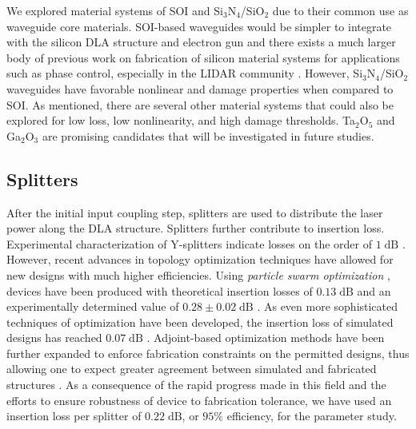 
We explored material systems of SOI and Si$_3$N$_4$/SiO$_2$ due to their common use as waveguide core materials.
SOI-based waveguides would be simpler to integrate with the silicon DLA structure and electron gun and there exists a much larger body of previous work on fabrication of silicon material systems for applications such as phase control, especially in the LIDAR community \cite{yaacobi2014integrated, kwong20111}.
However, Si$_3$N$_4$/SiO$_2$ waveguides have favorable nonlinear and damage properties when compared to SOI.
As mentioned, there are several other material systems that could also be explored for low loss, low nonlinearity, and high damage thresholds.
Ta$_2$O$_5$ \cite{belt2017ultra} and Ga$_2$O$_3$ are promising candidates that will be investigated in future studies.

\subsection{Splitters}
After the initial input coupling step, splitters are used to distribute the laser power along the DLA structure.
Splitters further contribute to insertion loss.
Experimental characterization of Y-splitters indicate losses on the order of $1\;\text{dB}$ \cite{zhang2013compact}.
However, recent advances in topology optimization techniques have allowed for new designs with much higher efficiencies.
Using \textit{particle swarm optimization} \cite{eberhart1995new}, devices have been produced with theoretical insertion losses of $0.13\;\text{dB}$ and an experimentally determined value of $0.28 \pm 0.02\;\text{dB}$ \cite{zhang2013compact}.
As even more sophisticated techniques of optimization have been developed, the insertion loss of simulated designs has reached $0.07\;\text{dB}$ \cite{lalau2013adjoint}.
Adjoint-based optimization methods have been further expanded to enforce fabrication constraints on the permitted designs, thus allowing one to expect greater agreement between simulated and fabricated structures \cite{piggott2017fabrication}.
As a consequence of the rapid progress made in this field and the efforts to ensure robustness of device to fabrication tolerance, we have used an insertion loss per splitter of $0.22\;\text{dB}$, or $95\%$ efficiency, for the parameter study.

